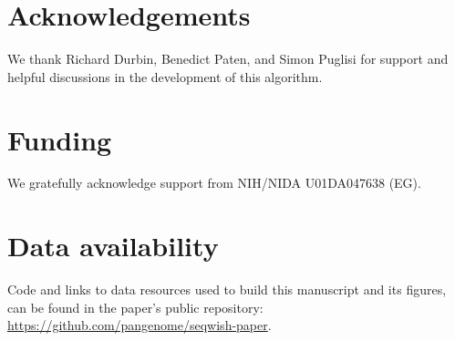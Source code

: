\documentclass{bioinfo}
\begin{document}
    \section*{Acknowledgements}

    We thank Richard Durbin, Benedict Paten, and Simon Puglisi for support and helpful discussions in the development of this algorithm.

    \section*{Funding}

    We gratefully acknowledge support from NIH/NIDA U01DA047638 (EG).

    \section*{Data availability}

    Code and links to data resources used to build this manuscript and its figures, can be found in the paper's public repository: \url{https://github.com/pangenome/seqwish-paper}.

    

    
\end{document}
